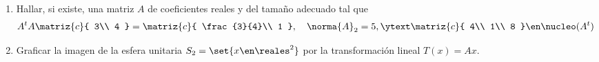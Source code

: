\begin{enunciado}{\ejExtra}
  \begin{enumerate}[label=(\alph*)]
    \item Hallar, si existe, una matriz $A$ de coeficientes reales y del tamaño adecuado tal que
          $$
            A^tA
            \matriz{c}{
              3\\
              4
            }
            =
            \matriz{c}{
              \frac{3}{4}\\
              1
            },
            \quad
            \norma{A}_2 = 5,
            \ytext
            \matriz{c}{
              4\\
              1\\
              8
            } \en \nucleo(A^t)
          $$

    \item Graficar la imagen de la esfera unitaria $S_2 = \set{x \en \reales^2}$ por la transformación lineal
          $T(x) = Ax$.
  \end{enumerate}
\end{enunciado}

